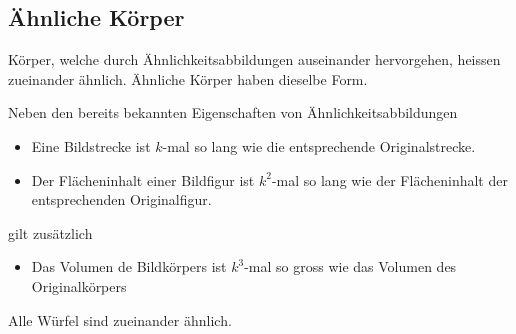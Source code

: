 \documentclass[%
11pt,%
twoside,%
titlepage,%
german,%
headsepline%
]{scrartcl}
\begin{document}
\subsection{\"Ahnliche K\"orper}
K\"orper, welche durch \"Ahnlichkeitsabbildungen auseinander hervorgehen, heissen zueinander \"ahnlich. \"Ahnliche K\"orper haben dieselbe Form.

Neben den bereits bekannten Eigenschaften von \"Ahnlichkeitsabbildungen
\begin{itemize}
\item Eine Bildstrecke ist $k$-mal so lang wie die entsprechende Originalstrecke.
\item Der Fl\"acheninhalt einer Bildfigur ist $k^2$-mal so lang wie der Fl\"acheninhalt der entsprechenden Originalfigur.
\end{itemize}
gilt zus\"atzlich
\begin{itemize}
\item Das Volumen de Bildk\"orpers ist $k^3$-mal so gross wie das Volumen des Originalk\"orpers%
\end{itemize}

\begin{bsp}
Alle W\"urfel sind zueinander \"ahnlich.\\

\begin{center}
\end{center}
\end{bsp}
\end{document}
